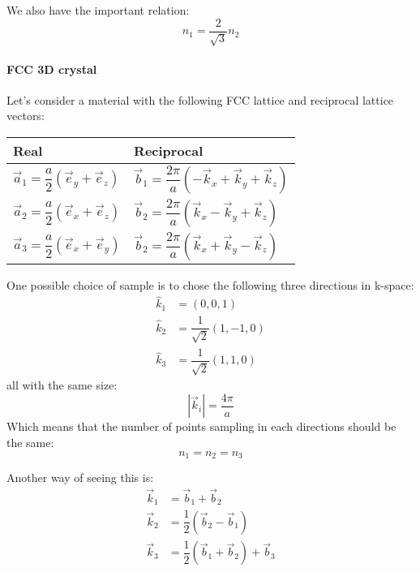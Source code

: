 \documentclass[a4paper,12pt]{report}
\begin{document}
We also have the important relation:
\begin{equation}
 n_1 = \dfrac{2}{\sqrt{3}} n_2
\end{equation}



\paragraph{FCC 3D crystal}

 Let's consider a material with the following FCC lattice and reciprocal lattice vectors:
 \medskip

\begin{tabular}{l|l}
\centering
Real & Reciprocal \\[0.1cm]\hline
$\vec{a}_1 = \dfrac{a}{2}\left( \vec{e}_y + \vec{e}_z\right) $ &
$\vec{b}_1 = \dfrac{2\pi}{a}\left( -\vec{k}_x + \vec{k}_y  + \vec{k}_z\right) $\\[0.2cm]
$\vec{a}_2 = \dfrac{a}{2}\left( \vec{e}_x + \vec{e}_z\right) $ &
$\vec{b}_2 = \dfrac{2\pi}{a}\left( \vec{k}_x - \vec{k}_y + \vec{k}_z\right) $\\[0.2cm]
$\vec{a}_3 = \dfrac{a}{2}\left( \vec{e}_x + \vec{e}_y\right) $ &
$\vec{b}_2 = \dfrac{2\pi}{a}\left( \vec{k}_x + \vec{k}_y - \vec{k}_z\right) $\\[0.2cm]
\hline
\end{tabular}
\bigskip

One possible choice of sample is to chose the following three directions in k-space:
\begin{align*}
 \hat{k}_1 &= (0,0,1)\\
 \hat{k}_2 &= \dfrac{1}{\sqrt{2}}(1,-1,0)\\
 \hat{k}_3 &= \dfrac{1}{\sqrt{2}}(1,1,0)
\end{align*}
all with the same size:
\begin{equation}
 |\vec{k}_i| = \dfrac{4\pi}{a}
\end{equation}
Which means that the number of points sampling in each directions should be the same:
\begin{equation}
 n_1 = n_2 = n_3
\end{equation}

Another way of seeing this is:
\begin{align*}
 \vec{k}_1 &= \vec{b}_1 + \vec{b}_2 \\
 \vec{k}_2 &= \dfrac{1}{2}(\vec{b}_2 - \vec{b}_1) \\
 \vec{k}_3 &= \dfrac{1}{2}(\vec{b}_1 + \vec{b}_2) + \vec{b}_3
\end{align*}
\end{document}
